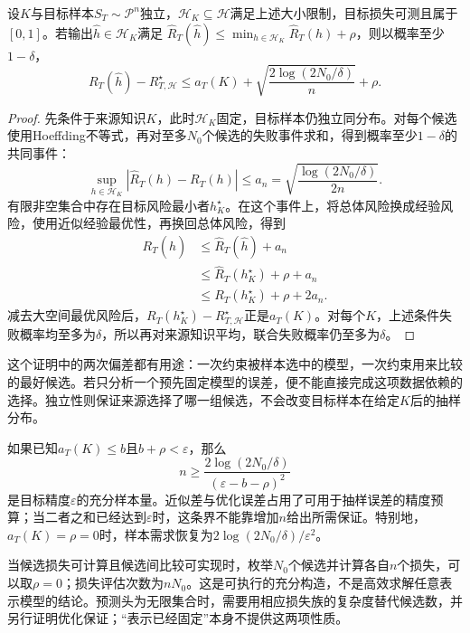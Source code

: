 \begin{theorem}[复用知识后的目标风险保证]
\label{thm:task-transfer-finite}
设$K$与目标样本$S_T\sim\mathcal P^n$独立，$\mathcal H_K\subseteq\mathcal H$满足上述大小限制，目标损失可测且属于$[0,1]$。若输出$\widehat h\in\mathcal H_K$满足
$\widehat R_T(\widehat h)\leq\min_{h\in\mathcal H_K}\widehat R_T(h)+\rho$，则以概率至少$1-\delta$，
\begin{equation}
 R_T(\widehat h)-R_{T,\mathcal H}^{\star}
 \leq a_T(K)+\sqrt{\frac{2\log(2N_0/\delta)}{n}}+\rho.
 \label{eq:task-transfer-finite}
\end{equation}
\end{theorem}
\begin{proof}
先条件于来源知识$K$，此时$\mathcal H_K$固定，目标样本仍独立同分布。对每个候选使用Hoeffding不等式，再对至多$N_0$个候选的失败事件求和，得到概率至少$1-\delta$的共同事件：
\[
 \sup_{h\in\mathcal H_K}|\widehat R_T(h)-R_T(h)|
 \leq a_n=\sqrt{\frac{\log(2N_0/\delta)}{2n}}.
\]
有限非空集合中存在目标风险最小者$h_K^\star$。在这个事件上，将总体风险换成经验风险，使用近似经验最优性，再换回总体风险，得到
\begin{align*}
 R_T(\widehat h)
 &\leq\widehat R_T(\widehat h)+a_n \\
 &\leq\widehat R_T(h_K^\star)+\rho+a_n \\
 &\leq R_T(h_K^\star)+\rho+2a_n.
\end{align*}
减去大空间最优风险后，$R_T(h_K^\star)-R_{T,\mathcal H}^{\star}$正是$a_T(K)$。对每个$K$，上述条件失败概率均至多为$\delta$，所以再对来源知识平均，联合失败概率仍至多为$\delta$。
\end{proof}

这个证明中的两次偏差都有用途：一次约束被样本选中的模型，一次约束用来比较的最好候选。若只分析一个预先固定模型的误差，便不能直接完成这项数据依赖的选择。独立性则保证来源选择了哪一组候选，不会改变目标样本在给定$K$后的抽样分布。

如果已知$a_T(K)\leq b$且$b+\rho<\varepsilon$，那么
\[
 n\geq\frac{2\log(2N_0/\delta)}{(\varepsilon-b-\rho)^2}
\]
是目标精度$\varepsilon$的充分样本量。近似差与优化误差占用了可用于抽样误差的精度预算；当二者之和已经达到$\varepsilon$时，这条界不能靠增加$n$给出所需保证。特别地，$a_T(K)=\rho=0$时，样本需求恢复为$2\log(2N_0/\delta)/\varepsilon^2$。

当候选损失可计算且候选间比较可实现时，枚举$N_0$个候选并计算各自$n$个损失，可以取$\rho=0$；损失评估次数为$nN_0$。这是可执行的充分构造，不是高效求解任意表示模型的结论。预测头为无限集合时，需要用相应损失族的复杂度替代候选数，并另行证明优化保证；“表示已经固定”本身不提供这两项性质。


